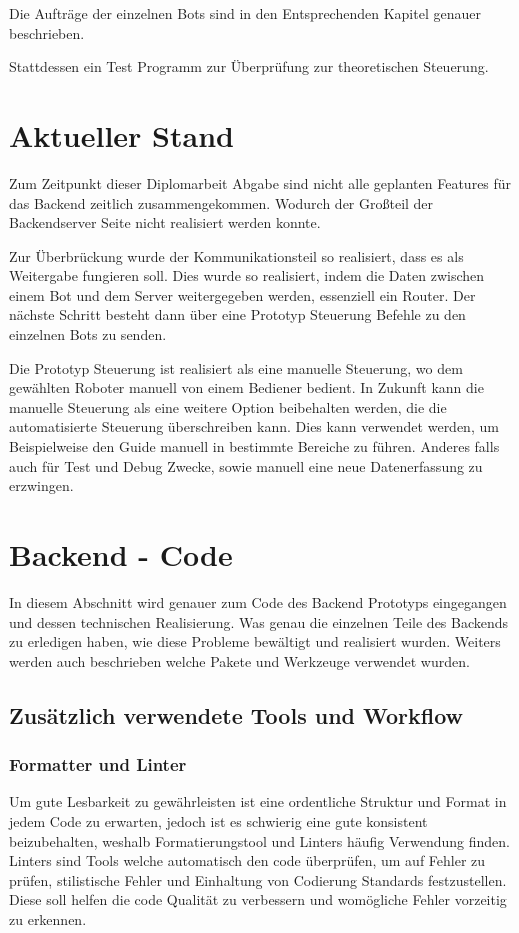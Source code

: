 Die Aufträge der einzelnen Bots sind in den Entsprechenden Kapitel genauer beschrieben.

Stattdessen ein Test Programm zur Überprüfung zur theoretischen Steuerung.

\section{Aktueller Stand}
\label{subsec:backend_aktueller_stand}
Zum Zeitpunkt dieser Diplomarbeit Abgabe 
sind nicht alle geplanten Features für das Backend zeitlich zusammengekommen.
Wodurch der Großteil der Backendserver Seite nicht realisiert werden konnte.

Zur Überbrückung wurde der Kommunikationsteil so realisiert, 
dass es als Weitergabe fungieren soll.
Dies wurde so realisiert, indem die Daten 
zwischen einem Bot und dem Server weitergegeben werden, essenziell ein Router. 
Der nächste Schritt besteht dann über eine Prototyp Steuerung 
Befehle zu den einzelnen Bots zu senden.

Die Prototyp Steuerung ist realisiert als eine manuelle Steuerung, 
wo dem gewählten Roboter manuell von einem Bediener bedient.
In Zukunft kann die manuelle Steuerung als eine weitere Option beibehalten werden, 
die die automatisierte Steuerung überschreiben kann. 
Dies kann verwendet werden, 
um Beispielweise den Guide manuell in bestimmte Bereiche zu führen.
Anderes falls auch für Test und Debug Zwecke, 
sowie manuell eine neue Datenerfassung zu erzwingen.

\section{Backend - Code}
In diesem Abschnitt wird genauer zum Code des Backend Prototyps eingegangen 
und dessen technischen Realisierung. 
Was genau die einzelnen Teile des Backends zu erledigen haben, 
wie diese Probleme bewältigt und realisiert wurden.
Weiters werden auch beschrieben welche Pakete und Werkzeuge verwendet wurden. 

\subsection{Zusätzlich verwendete Tools und Workflow}
\subsubsection{Formatter und Linter} 
Um gute Lesbarkeit zu gewährleisten 
ist eine ordentliche Struktur und Format in jedem Code zu erwarten, 
jedoch ist es schwierig eine gute konsistent beizubehalten, 
weshalb Formatierungstool und Linters häufig Verwendung finden. 
% 
Linters sind Tools welche automatisch den code überprüfen, um auf Fehler zu prüfen, 
stilistische Fehler und Einhaltung von Codierung Standards festzustellen.
Diese soll helfen die code Qualität zu verbessern 
und womögliche Fehler vorzeitig zu erkennen.

